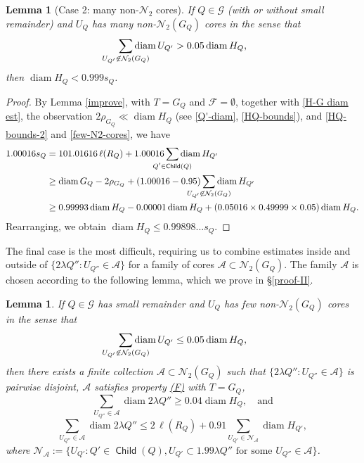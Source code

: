 \documentclass[12pt]{amsart}
\numberwithin{equation}{section}
\theoremstyle{plain}
\newtheorem{lemma}[theorem]{Lemma}
\newtheorem{keylemma}{Lemma}
\theoremstyle{definition}
\newcommand{\diam}{\mathop\mathrm{diam}\nolimits}
\newcommand{\Child}{\mathop\mathsf{Child}\nolimits}
\numberwithin{figure}{section}
\begin{document}
\begin{lemma}[Case 2: many non-$\mathcal{N}_2$ cores]\label{case2} If $Q\in\mathscr{G}$ (with or without small remainder) and $U_Q$ has many non-$\mathcal{N}_2(G_Q)$ cores in the sense that \begin{equation}\label{few-N2-cores}\sum_{\mathclap{U_{Q'}\not\in\mathcal{N}_2(G_Q)}}\diam U_{Q'} > 0.05\diam H_Q,\end{equation} then $\diam H_Q < 0.999 s_Q$.
\end{lemma}

\begin{proof} By Lemma \ref{improve}, with $T=G_Q$ and $\mathcal{F}=\emptyset$, together with \eqref{H-G diam est}, the observation $2\rho_{G_Q}\ll \diam H_Q$ (see \eqref{Q'-diam}, \eqref{HQ-bounds}), and \eqref{HQ-bounds-2} and \eqref{few-N2-cores}, we have
\begin{align*}
1.00016s_Q&= 101.01616\,\ell(R_Q)+ 1.00016\sum_{\mathclap{Q'\in\Child(Q)}} \diam H_{Q'}\\
&\geq \diam G_Q - 2\rho_{G_Q} + (1.00016-0.95)\sum_{\mathclap{U_{Q'}\not \in \mathcal{N}_2(G_Q)}} \diam H_{Q'}\\
&\geq 0.99993\diam H_Q - 0.00001\diam H_Q + (0.05016\times 0.49999\times
0.05)\diam H_Q.\end{align*}
Rearranging, we obtain $\diam H_Q \leq 0.99898...s_Q$.
\end{proof}

The final case is the most difficult, requiring us to combine estimates inside and outside of $\{2\lambda Q'':U_{Q''}\in\mathcal{A}\}$ for a family of cores $\mathcal{A}\subset\mathcal{N}_2(G_Q)$. The family $\mathcal{A}$ is chosen according to the following lemma, which we prove in \S\ref{proof-II}.

\begin{keylemma}\label{l:B_2 subset} If $Q\in\mathscr{G}$ has small remainder and $U_Q$ has few non-$\mathcal{N}_2(G_Q)$ cores in the sense that \begin{equation}\label{many-N2-cores}\sum_{\mathclap{U_{Q'}\not\in\mathcal{N}_2(G_Q)}}\diam U_{Q'} \leq 0.05\diam H_Q,\end{equation}
then there exists a finite collection $\mathcal{A} \subset \mathcal{N}_2(G_Q)$ such that $\{2\lambda Q'':U_{Q''}\in\mathcal{A}\}$ is pairwise disjoint, $\mathcal{A}$ satisfies property \hyperref[property-F]{(F)} with $T=G_Q$, \begin{equation}\label{A-estimates 2}
\sum_{U_{Q''}\in\mathcal{A}} \diam 2\lambda Q''\geq 0.04\diam H_Q,\quad\text{and}\end{equation} \begin{equation} \label{A-estimates} \sum_{U_{Q''}\in\mathcal{A}} \diam 2\lambda Q'' \leq 2\,\ell(R_Q)+0.91\sum_{U_{Q'}\in\mathcal{N}_\mathcal{A}} \diam H_{Q'},\end{equation} where $\mathcal{N}_\mathcal{A}:=\{U_{Q'}:Q'\in\Child(Q), U_{Q'}\subset 1.99\lambda Q''\text{ for some }U_{Q''}\in\mathcal{A}\}$.
\end{keylemma}
\end{document}
